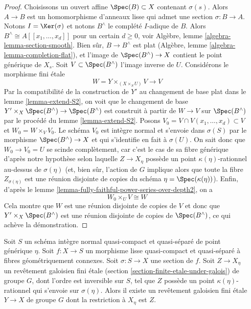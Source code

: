 \begin{proof}
\medskip\noindent
Choisissons un ouvert affine $\Spec(B) \subset X$ contenant $\sigma(s)$.
Alors $A \to B$ est un homomorphisme d'anneaux lisse qui admet une section $\sigma : B \to A$.
Notons $I = \Ker(\sigma)$ et notons $B^\wedge$ le
complété $I$-adique de $B$. Alors $B^\wedge \cong A[[x_1, \ldots, x_d]]$
pour un certain $d \geq 0$, voir
Algèbre, lemme \ref{algebra-lemma-section-smooth}.
Bien sûr, $B \to B^\wedge$ est plat
(Algèbre, lemme \ref{algebra-lemma-completion-flat}),
et l'image de $\Spec(B^\wedge) \to X$ contient le point générique de $X_s$.
Soit $V \subset \Spec(B^\wedge)$ l'image inverse de $U$.
Considérons le morphisme fini \'etale
$$
W = Y \times_{(X \times_S U)} V \longrightarrow V
$$
Par la compatibilité de la construction de $Y'$
au changement de base plat dans le lemme \ref{lemma-extend-S2},
on voit que le changement de base
$Y' \times_X \Spec(B^\wedge) \to \Spec(B^\wedge)$
est construit à partir de $W \to V$ sur $\Spec(B^\wedge)$
par le procédé du lemme \ref{lemma-extend-S2}.
Posons $V_0 = V \cap V(x_1, \ldots, x_d) \subset V$ et $W_0 = W \times_V V_0$.
Le schéma $V_0$ est intègre normal et s'envoie dans $\sigma(S)$
par le morphisme $\Spec(B^\wedge) \to X$ et qui s'identifie en fait
à $\sigma(U)$. On sait donc que $W_0 \to V_0 = U$ se scinde complètement,
car c'est le cas de sa fibre générique d'après notre hypothèse
selon laquelle $Z \to X_\eta$ possède un point $\kappa(\eta)$-rationnel au-dessus de
$\sigma(\eta)$ (et, bien sûr, l'action de $G$ implique alors que toute la
fibre $Z_{\sigma(\eta)}$ est une réunion disjointe de copies du
schéma $\eta = \Spec(\kappa(\eta))$).
Enfin, d'après le
lemme \ref{lemma-fully-faithful-power-series-over-depth2},
on a
$$
W_0 \times_U V \cong W
$$
Cela montre que $W$ est une réunion disjointe de copies de $V$
et donc que $Y' \times_X \Spec(B^\wedge)$ est une réunion disjointe
de copies de $\Spec(B^\wedge)$, ce qui achève la démonstration.
\end{proof}

\begin{lemma}
\label{lemma-extend-covering-general}
Soit $S$ un schéma intègre normal quasi-compact et quasi-séparé
de point générique $\eta$. Soit $f : X \to S$ un morphisme lisse quasi-compact et
quasi-séparé à fibres géométriquement connexes.
Soit $\sigma : S \to X$ une section de $f$. Soit $Z \to X_\eta$ un
revêtement galoisien fini \'etale (section \ref{section-finite-etale-under-galois})
de groupe $G$, dont l'ordre est inversible sur $S$, tel que
$Z$ possède un point $\kappa(\eta)$-rationnel qui s'envoie sur $\sigma(\eta)$.
Alors il existe un revêtement galoisien fini \'etale $Y \to X$ de groupe $G$
dont la restriction à $X_\eta$ est $Z$.
\end{lemma}

